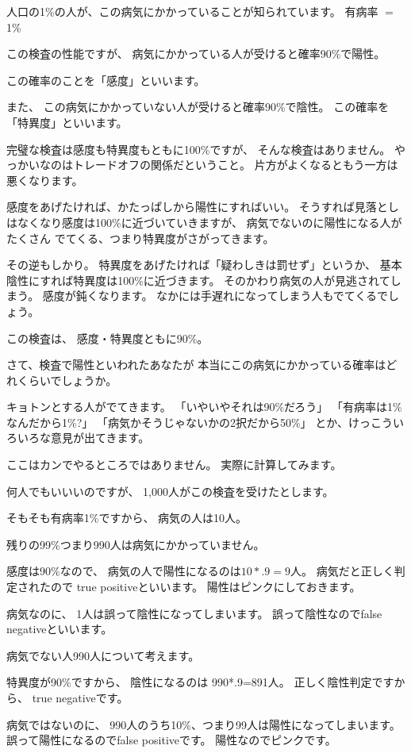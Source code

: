 \documentclass[uplatex,jis2004,dvipdfmx,12pt]{jsarticle}
\begin{document}
人口の1\%の人が、この病気にかかっていることが知られています。
有病率 $=$ 1\%

この検査の性能ですが、
病気にかかっている人が受けると確率90\%で陽性。

この確率のことを「感度」といいます。

また、
この病気にかかっていない人が受けると確率90\%で陰性。
この確率を「特異度」といいます。



完璧な検査は感度も特異度もともに100\%ですが、
そんな検査はありません。
やっかいなのはトレードオフの関係だということ。
片方がよくなるともう一方は悪くなります。

感度をあげたければ、かたっぱしから陽性にすればいい。
そうすれば見落としはなくなり感度は100\%に近づいていきますが、
病気でないのに陽性になる人がたくさん
でてくる、つまり特異度がさがってきます。

その逆もしかり。
特異度をあげたければ「疑わしきは罰せず」というか、
基本陰性にすれば特異度は100\%に近づきます。
そのかわり病気の人が見逃されてしまう。
感度が鈍くなります。
なかには手遅れになってしまう人もでてくるでしょう。

この検査は、
感度・特異度ともに90\%。


さて、検査で陽性といわれたあなたが
本当にこの病気にかかっている確率はどれくらいでしょうか。

キョトンとする人がでてきます。
「いやいやそれは90\%だろう」
「有病率は1\%なんだから1\%?」
「病気かそうじゃないかの2択だから50\%」
とか、けっこういろいろな意見が出てきます。

ここはカンでやるところではありません。
実際に計算してみます。


何人でもいいいのですが、
1,000人がこの検査を受けたとします。


そもそも有病率1\%ですから、
病気の人は10人。

残りの99\%つまり990人は病気にかかっていません。

感度は90\%なので、
病気の人で陽性になるのは$10*.9=9$人。
病気だと正しく判定されたので
true positiveといいます。
陽性はピンクにしておきます。

病気なのに、
1人は誤って陰性になってしまいます。
誤って陰性なのでfalse negativeといいます。

病気でない人990人について考えます。

特異度が90\%ですから、
陰性になるのは
990*.9=891人。
正しく陰性判定ですから、
true negativeです。

病気ではないのに、
990人のうち10\%、つまり99人は陽性になってしまいます。
誤って陽性になるのでfalse positiveです。
陽性なのでピンクです。
\end{document}
